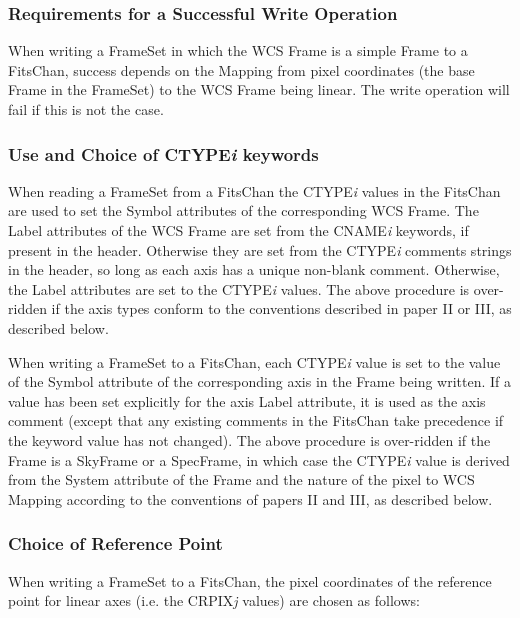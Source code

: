 \documentclass[twoside,11pt]{article}
\begin{document}
\subsubsection{Requirements for a Successful Write Operation}
When writing a FrameSet in which the WCS
Frame is a simple Frame to a FitsChan,
success depends on the Mapping from pixel coordinates
(the base Frame in the FrameSet) to the WCS Frame being linear. The write
operation will fail if this is not the case.

\subsubsection{Use and Choice of CTYPE\emph{i} keywords}
When reading a FrameSet from a FitsChan the CTYPE\emph{i} values in the FitsChan are used to set the
Symbol attributes of the corresponding WCS Frame. The Label attributes of the WCS Frame are set from
the CNAME\emph{i} keywords, if present in the header. Otherwise they are set
from the CTYPE\emph{i} comments strings in the header, so long as each
axis has a unique non-blank comment. Otherwise, the Label attributes are
set to the CTYPE\emph{i} values. The above procedure is over-ridden if
the axis types conform to the conventions described in paper II or III,
as described below.

When writing a FrameSet to a FitsChan, each CTYPE\emph{i} value is set to
the value of the Symbol attribute of the corresponding axis in the Frame
being written. If a value has been set explicitly for the axis Label
attribute, it is used as the axis comment (except that any existing
comments in the FitsChan take precedence if the keyword value has not
changed). The above procedure is over-ridden if the Frame is a
SkyFrame or a SpecFrame, in which
case the CTYPE\emph{i} value is derived from the System
attribute of the Frame and the nature of the pixel to WCS Mapping
according to the conventions of papers II and III, as described below.

\subsubsection{Choice of Reference Point}
When writing a FrameSet to a
FitsChan, the pixel coordinates of the
reference point for linear axes (i.e. the CRPIX\emph{j} values) are
chosen as follows:
\end{document}
